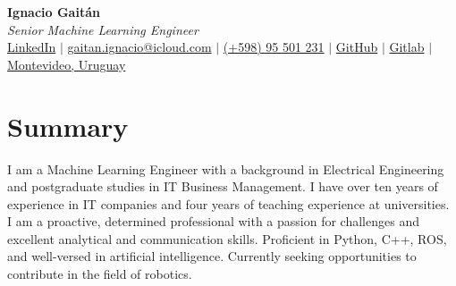 \documentclass[letterpaper,11pt]{article}
\begin{document}
\begin{center}
    \textbf{\LARGE Ignacio Gaitán} \\ \vspace{2ex}
    \textit{Senior Machine Learning Engineer} \\ \vspace{2ex}
    \small
    \faLinkedinSquare \hspace{.5pt} \href{https://www.linkedin.com/in/ignacio-gaitan}{LinkedIn}
    $|$
    \faAt \hspace{.5pt} \href{mailto:gaitan.ignacio@icloud.com}{gaitan.ignacio@icloud.com}
    $|$
    \faMobile \hspace{.5pt} \href{tel:+59895501231}{(+598) 95 501 231}
    $|$
    \faGithub \hspace{.5pt} \href{https://github.com/gaitanignacio}{GitHub}
    $|$
    \faGithub \hspace{.5pt} \href{https://gitlab.com/gaitan.ignacio}{Gitlab}
    $|$
    \faMapMarker \hspace{.5pt} \href{https://www.google.com/maps/place/Prof.+Juan+Carlos+Sabat+Pebet+1234,+11300+Montevideo,+Departamento+de+Montevideo,+Uruguay/@-34.9044985,-56.1366609,17z/data=!3m1!4b1!4m6!3m5!1s0x959f813e56b3cedd:0x5a415e79543b2770!8m2!3d-34.9044985!4d-56.134086!16s%2Fg%2F11pysbccyt?entry=ttu}{Montevideo, Uruguay}
\end{center}

\vspace{-2ex}

\section*{Summary}
I am a Machine Learning Engineer with a background in Electrical Engineering and postgraduate studies in IT Business Management. I have over ten years of experience in IT companies and four years of teaching experience at universities. I am a proactive, determined professional with a passion for challenges and excellent analytical and communication skills. Proficient in Python, C++, ROS, and well-versed in artificial intelligence. Currently seeking opportunities to contribute in the field of robotics.
\end{document}
